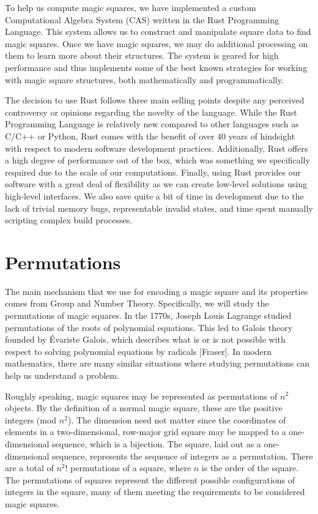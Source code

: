 \documentclass[12pt]{report}
\begin{document}
\par To help us compute magic squares, we have implemented a custom Computational Algebra System
(CAS) written in the Rust Programming Language. This system allows us to construct and manipulate
square data to find magic squares. Once we have magic squares, we may do additional processing on
them to learn more about their structures. The system is geared for high performance and thus
implements some of the best known strategies for working with magic square structures, both
mathematically and programmatically.

\par The decision to use Rust follows three main selling points despite any perceived controversy
or opinions regarding the novelty of the language. While the Rust Programming Language is relatively
new compared to other languages such as C/C++ or Python, Rust comes with the benefit of over 40 years
of hindsight with respect to modern software development practices. Additionally, Rust offers a high
degree of performance out of the box, which was something we specifically required due to the scale of
our computations. Finally, using Rust provides our software with a great deal of flexibility as we can
create low-level solutions using high-level interfaces. We also save quite a bit of time in development
due to the lack of trivial memory bugs, representable invalid states, and time spent manually scripting
complex build processes.

\section{Permutations}

\par The main mechanism that we use for encoding a magic square and its properties comes from Group
and Number Theory. Specifically, we will study the permutations of magic squares. In the 1770s,
Joseph Louis Lagrange studied permutations of the roots of polynomial equations. This led to Galois
theory founded by Évariste Galois, which describes what is or is not possible with respect to
solving polynomial equations by radicals [Fraser]. In modern mathematics, there are many similar
situations where studying permutations can help us understand a problem.

\par Roughly speaking, magic squares may be represented as permutations of $n^2$ objects. By the
definition of a normal magic square, these are the positive integers (mod $n^2$). The dimension
need not matter since the coordinates of elements in a two-dimensional, row-major grid square may
be mapped to a one-dimensional sequence, which is a bijection. The square, laid out as a
one-dimensional sequence, represents the sequence of integers as a permutation. There are a total of
$n^{2}$! permutations of a square, where $n$ is the order of the
square. The permutations of squares represent the different possible configurations of integers in
the square, many of them meeting the requirements to be considered magic squares.
\end{document}
